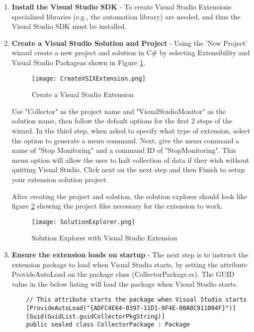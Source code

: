 \begin{enumerate}
\item {\bf Install the Visual Studio SDK} - To create Visual Studio Extensions specialized libraries (e.g., the automation library) are needed, and thus the Visual Studio SDK must be installed.

\item {\bf Create a Visual Studio Solution and Project} - Using the 'New Project' wizard create a new project and solution in C\# by selecting Extensibility and Visual Studio Packageas shown in Figure \ref{fig:ProjectCreation}.  
\begin{figure}
	\centering
	\texttt{[image: CreateVSIXExtension.png]}
	\caption{Create a Visual Studio Extension}
	\label{fig:ProjectCreation}
\end{figure}

Use "Collector" as the project name and "VisualStudioMonitor" as the solution name, then follow the default options for the first 2 steps of the wizard.  In the third step, when asked to specify what type of extension, select the option to generate a menu command.  Next, give the menu command a name of "Stop Monitoring" and a command ID of "StopMonitoring".  This menu option will allow the user to halt collection of data if they wish without quitting Visual Studio.  Click next on the next step and then Finish to setup your extension solution project.


After creating the project and solution, the solution explorer should look like figure \ref{fig:SolutionExplorer} showing the project files necessary for the extension to work.
\begin{figure}
	\centering
	\texttt{[image: SolutionExplorer.png]}
	\caption{Solution Explorer with Visual Studio Extension}
	\label{fig:SolutionExplorer}
\end{figure}


\item {\bf Ensure the extension loads on startup} - The next step is to instruct the extension package to load when Visual Studio starts, by setting the attribute ProvideAutoLoad on the package class (CollectorPackage.cs). The GUID value in the below listing will load the package when Visual Studio starts.

\begin{lstlisting}
    // This attribute starts the package when Visual Studio starts 
    [ProvideAutoLoad("{ADFC4E64-0397-11D1-9F4E-00A0C911004F}")]
    [Guid(GuidList.guidCollectorPkgString)]
    public sealed class CollectorPackage : Package
\end{lstlisting}

\end{enumerate}

